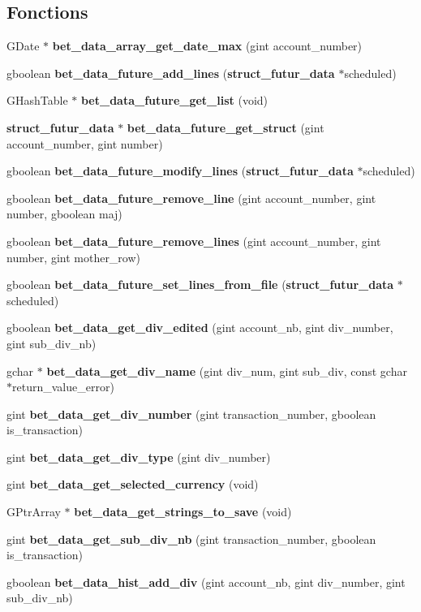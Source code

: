 \subsection*{Fonctions}
\begin{DoxyCompactItemize}
\item 
GDate $\ast$ {\bf bet\_\-data\_\-array\_\-get\_\-date\_\-max} (gint account\_\-number)
\item 
gboolean {\bf bet\_\-data\_\-future\_\-add\_\-lines} ({\bf struct\_\-futur\_\-data} $\ast$scheduled)
\item 
GHashTable $\ast$ {\bf bet\_\-data\_\-future\_\-get\_\-list} (void)
\item 
{\bf struct\_\-futur\_\-data} $\ast$ {\bf bet\_\-data\_\-future\_\-get\_\-struct} (gint account\_\-number, gint number)
\item 
gboolean {\bf bet\_\-data\_\-future\_\-modify\_\-lines} ({\bf struct\_\-futur\_\-data} $\ast$scheduled)
\item 
gboolean {\bf bet\_\-data\_\-future\_\-remove\_\-line} (gint account\_\-number, gint number, gboolean maj)
\item 
gboolean {\bf bet\_\-data\_\-future\_\-remove\_\-lines} (gint account\_\-number, gint number, gint mother\_\-row)
\item 
gboolean {\bf bet\_\-data\_\-future\_\-set\_\-lines\_\-from\_\-file} ({\bf struct\_\-futur\_\-data} $\ast$scheduled)
\item 
gboolean {\bf bet\_\-data\_\-get\_\-div\_\-edited} (gint account\_\-nb, gint div\_\-number, gint sub\_\-div\_\-nb)
\item 
gchar $\ast$ {\bf bet\_\-data\_\-get\_\-div\_\-name} (gint div\_\-num, gint sub\_\-div, const gchar $\ast$return\_\-value\_\-error)
\item 
gint {\bf bet\_\-data\_\-get\_\-div\_\-number} (gint transaction\_\-number, gboolean is\_\-transaction)
\item 
gint {\bf bet\_\-data\_\-get\_\-div\_\-type} (gint div\_\-number)
\item 
gint {\bf bet\_\-data\_\-get\_\-selected\_\-currency} (void)
\item 
GPtrArray $\ast$ {\bf bet\_\-data\_\-get\_\-strings\_\-to\_\-save} (void)
\item 
gint {\bf bet\_\-data\_\-get\_\-sub\_\-div\_\-nb} (gint transaction\_\-number, gboolean is\_\-transaction)
\item 
gboolean {\bf bet\_\-data\_\-hist\_\-add\_\-div} (gint account\_\-nb, gint div\_\-number, gint sub\_\-div\_\-nb)
\item 

\end{DoxyCompactItemize}
